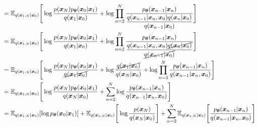 \documentclass[14pt, a4paper]{article}
\numberwithin{equation}{section}
\numberwithin{figure}{section}
\numberwithin{dl}{section}
\numberwithin{md}{section}
\numberwithin{bd}{section}
\numberwithin{dn}{section}
\numberwithin{hq}{section}
\begin{document}
\begin{equation*}
\begin{aligned}
            &= \mathbb{E}_{q(\boldsymbol{x}_{1:N} \vert \boldsymbol{x}_0)} \Bigg \lbrack \log \dfrac{p(\boldsymbol{x}_N) p_{\boldsymbol{\theta}} (\boldsymbol{x}_0 \vert \boldsymbol{x}_1)}{q(\boldsymbol{x}_1 \vert \boldsymbol{x}_0)} + \log \prod_{n=2}^N \dfrac{p_{\boldsymbol{\theta}} (\boldsymbol{x}_{n-1} \vert \boldsymbol{x}_n)}{\dfrac{q(\boldsymbol{x}_{n-1} \vert \boldsymbol{x}_n, \boldsymbol{x}_0) q(\boldsymbol{x}_n \vert \boldsymbol{x}_0)}{q(\boldsymbol{x}_{n-1} \vert \boldsymbol{x}_0)}} \Bigg \rbrack \\
            &= \mathbb{E}_{q(\boldsymbol{x}_{1:N} \vert \boldsymbol{x}_0)} \Bigg \lbrack \log \dfrac{p(\boldsymbol{x}_N) p_{\boldsymbol{\theta}} (\boldsymbol{x}_0 \vert \boldsymbol{x}_1)}{q(\boldsymbol{x}_1 \vert \boldsymbol{x}_0)} + \log \prod_{n=2}^N \dfrac{p_{\boldsymbol{\theta}} (\boldsymbol{x}_{n-1} \vert \boldsymbol{x}_n)}{\dfrac{q(\boldsymbol{x}_{n-1} \vert \boldsymbol{x}_n, \boldsymbol{x}_0) \cancel{q(\boldsymbol{x}_n \vert \boldsymbol{x}_0)}}{\cancel{q(\boldsymbol{x}_{n-1} \vert \boldsymbol{x}_0)}}} \Bigg \rbrack \\
            &= \mathbb{E}_{q(\boldsymbol{x}_{1:N} \vert \boldsymbol{x}_0)} \Bigg \lbrack \log \dfrac{p(\boldsymbol{x}_N) p_{\boldsymbol{\theta}} (\boldsymbol{x}_0 \vert \boldsymbol{x}_1)}{\cancel{q(\boldsymbol{x}_1 \vert \boldsymbol{x}_0)}} + \log \dfrac{\cancel{q(\boldsymbol{x}_1 \vert \boldsymbol{x}_0)}}{q(\boldsymbol{x}_N \vert \boldsymbol{x}_0)} + \log \prod_{n=2}^N \dfrac{p_{\boldsymbol{\theta}} (\boldsymbol{x}_{n-1} \vert \boldsymbol{x}_n)}{q(\boldsymbol{x}_{n-1} \vert \boldsymbol{x}_n, \boldsymbol{x}_0)} \Bigg \rbrack \\
            &= \mathbb{E}_{q(\boldsymbol{x}_{1:N} \vert \boldsymbol{x}_0)} \Bigg \lbrack \log \dfrac{p(\boldsymbol{x}_N) p_{\boldsymbol{\theta}} (\boldsymbol{x}_0 \vert \boldsymbol{x}_1)}{q(\boldsymbol{x}_N \vert \boldsymbol{x}_0)} + \sum_{n=2}^N \log \dfrac{p_{\boldsymbol{\theta}} (\boldsymbol{x}_{n-1} \vert \boldsymbol{x}_n)}{q(\boldsymbol{x}_{n-1} \vert \boldsymbol{x}_n, \boldsymbol{x}_0)} \Bigg \rbrack \\
            &= \mathbb{E}_{q(\boldsymbol{x}_{1:N} \vert \boldsymbol{x}_0)} \lbrack \log p_{\boldsymbol{\theta}} (\boldsymbol{x}_0 \vert \boldsymbol{x}_1) \rbrack + \mathbb{E}_{q(\boldsymbol{x}_{1:N} \vert \boldsymbol{x}_0)} \Bigg \lbrack \log \dfrac{p(\boldsymbol{x}_N)}{q(\boldsymbol{x}_N \vert \boldsymbol{x}_0)} \Bigg \rbrack + \sum_{n=2}^N \mathbb{E}_{q(\boldsymbol{x}_{1:N} \vert \boldsymbol{x}_0)} \Bigg \lbrack \dfrac{p_{\boldsymbol{\theta}} (\boldsymbol{x}_{n-1} \vert \boldsymbol{x}_n)}{q(\boldsymbol{x}_{n-1} \vert \boldsymbol{x}_n, \boldsymbol{x}_0)} \Bigg \rbrack \\

\end{aligned}
\end{equation*}
\end{document}
